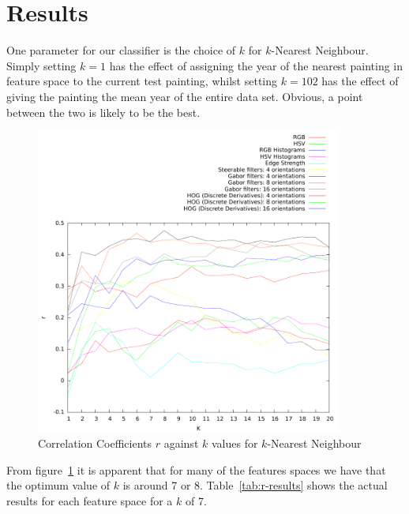 \section{Results}

One parameter for our classifier is the choice of $k$ for $k$-Nearest Neighbour. Simply setting 
$k=1$ has the effect of assigning the year of the nearest painting in feature space to the current
test painting, whilst setting $k=102$ has the effect of giving the painting the mean year of the 
entire data set. Obvious, a point between the two is likely to be the best. 

\begin{figure}[h]
\centering
\includegraphics[width=0.9\textwidth]{../../isispa-paper/results/mean}
\caption{Correlation Coefficients $r$ against $k$ values for $k$-Nearest Neighbour}\label{fig:r-graph}
\end{figure}

From figure~\ref{fig:r-graph} it is apparent that for many of the features spaces we have that the 
optimum value of $k$ is around 7 or 8. Table~\ref{tab:r-results} shows the actual results for each 
feature space for a $k$ of 7.

